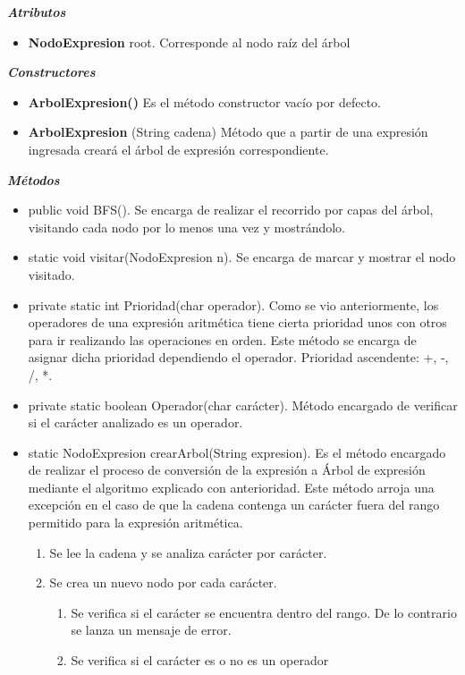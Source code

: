 \documentclass{article}
\begin{document}
\textit{\textbf{Atributos}}
\begin{itemize}
\item \textbf{NodoExpresion} root. Corresponde al nodo raíz del árbol
\end{itemize}
\vspace{5mm} %
\textit{\textbf{Constructores}}
\begin{itemize}
\item \textbf{ArbolExpresion()} Es el método constructor vacío por defecto. 
\item \textbf{ArbolExpresion} (String cadena) Método que a partir de una expresión ingresada creará el árbol de expresión correspondiente.
\end{itemize}
\vspace{5mm} %
\textit{\textbf{Métodos}}
\begin{itemize}
    \item public void BFS(). Se encarga de realizar el recorrido por capas del árbol, visitando cada nodo por lo menos una vez y mostrándolo.
    \item static void visitar(NodoExpresion n). Se encarga de marcar y mostrar el nodo visitado.
    \item private static int Prioridad(char operador). Como se vio anteriormente, los operadores de una expresión aritmética tiene cierta prioridad unos con otros para ir realizando las operaciones en orden. Este método se encarga de asignar dicha prioridad dependiendo el operador. Prioridad ascendente: +, -, /, *.
    \item private static boolean Operador(char carácter). Método encargado de verificar si el carácter analizado es un operador.
    \item static NodoExpresion crearArbol(String expresion). Es el método encargado de realizar el proceso de conversión de la expresión a Árbol de expresión mediante el algoritmo explicado con anterioridad. Este método arroja una excepción en el caso de que la cadena contenga un carácter fuera del rango permitido para la expresión aritmética.
\begin{enumerate}
\item Se lee la cadena y se analiza carácter por carácter.
\item Se crea un nuevo nodo por cada carácter.
\begin{enumerate}
\item Se verifica si el carácter se encuentra dentro del rango. De lo contrario se lanza un mensaje de error.
\item Se verifica si el carácter es o no es un operador

\end{enumerate}
\end{enumerate}
\end{itemize}
\end{document}
